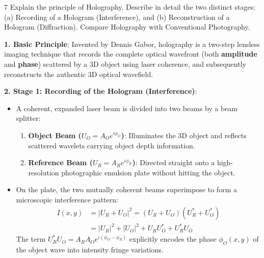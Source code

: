 \begin{theoryq}{7}
Explain the principle of Holography. Describe in detail the two distinct stages: (a) Recording of a Hologram (Interference), and (b) Reconstruction of a Hologram (Diffraction). Compare Holography with Conventional Photography.
\end{theoryq}
\begin{theorysol}
\textbf{1. Basic Principle}:
Invented by Dennis Gabor, holography is a two-step lensless imaging technique that records the complete optical wavefront (both \textbf{amplitude} and \textbf{phase}) scattered by a 3D object using laser coherence, and subsequently reconstructs the authentic 3D optical wavefield.

\textbf{2. Stage 1: Recording of the Hologram (Interference)}:
\begin{itemize}
    \item A coherent, expanded laser beam is divided into two beams by a beam splitter:
    \begin{enumerate}
        \item \textbf{Object Beam ($U_O = A_O e^{i\phi_O}$)}: Illuminates the 3D object and reflects scattered wavelets carrying object depth information.
        \item \textbf{Reference Beam ($U_R = A_R e^{i\phi_R}$)}: Directed straight onto a high-resolution photographic emulsion plate without hitting the object.
    \end{enumerate}
    \item On the plate, the two mutually coherent beams superimpose to form a microscopic interference pattern:
    \begin{align*}
    I(x,y) &= |U_R + U_O|^2 = (U_R + U_O)(U_R^* + U_O^*) \\
    &= |U_R|^2 + |U_O|^2 + U_R U_O^* + U_R^* U_O
    \end{align*}
    The term $U_R^* U_O = A_R A_O e^{i(\phi_O - \phi_R)}$ explicitly encodes the phase $\phi_O(x,y)$ of the object wave into intensity fringe variations.
\end{itemize}


\end{theorysol}
